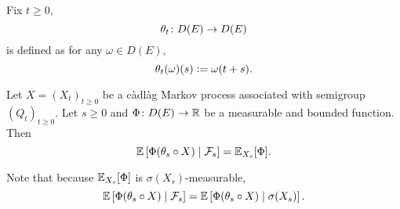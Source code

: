 \begin{defn}
    Fix $t \geq 0$,
    \begin{equation*}
        \theta_t \colon D(E) \rightarrow D(E)
    \end{equation*}
    is defined as for any $\omega \in D(E)$,
    \begin{equation*}
        \theta_t(\omega)(s) \vcentcolon= \omega(t+s).
    \end{equation*}
\end{defn}

\begin{thm}
    Let $X=(X_t)_{t \geq 0}$ be a c\`adl\`ag Markov process associated with semigroup $(Q_t)_{t \geq 0}$. Let $s \geq 0$ and $\Phi \colon D(E) \rightarrow \mathbb{R}$ be a measurable and bounded function. Then
    \begin{equation*}
        \mathbb{E}\left[\Phi(\theta_s \circ X) \mid \mathcal{F}_s\right] = \mathbb{E}_{X_s}[\Phi].
    \end{equation*}
\end{thm}
\begin{rmk}
    Note that because $\mathbb{E}_{X_s}[\Phi]$ is $\sigma(X_s)$-measurable,
    \begin{equation*}
        \mathbb{E}\left[\Phi(\theta_s \circ X) \mid \mathcal{F}_s\right] = \mathbb{E}\left[\Phi(\theta_s \circ X) \mid \sigma(X_s)\right].
    \end{equation*}
\end{rmk}
